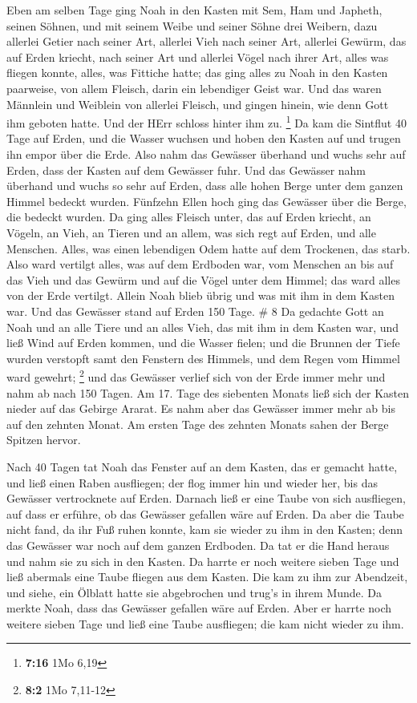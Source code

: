  Eben am selben Tage ging Noah in den Kasten mit Sem, Ham
und Japheth, seinen Söhnen, und mit seinem Weibe und seiner Söhne drei
Weibern,  dazu allerlei Getier nach seiner Art, allerlei
Vieh nach seiner Art, allerlei Gewürm, das auf Erden kriecht, nach
seiner Art und allerlei Vögel nach ihrer Art, alles was fliegen konnte,
alles, was Fittiche hatte;  das ging alles zu Noah in den
Kasten paarweise, von allem Fleisch, darin ein lebendiger Geist war.
 Und das waren Männlein und Weiblein von allerlei Fleisch,
und gingen hinein, wie denn Gott ihm geboten hatte. Und der HErr schloss
hinter ihm zu. \footnote{\textbf{7:16} 1Mo 6,19}  Da kam
die Sintflut 40 Tage auf Erden, und die Wasser wuchsen und hoben den
Kasten auf und trugen ihn empor über die Erde.  Also nahm
das Gewässer überhand und wuchs sehr auf Erden, dass der Kasten auf dem
Gewässer fuhr.  Und das Gewässer nahm überhand und wuchs so
sehr auf Erden, dass alle hohen Berge unter dem ganzen Himmel bedeckt
wurden.  Fünfzehn Ellen hoch ging das Gewässer über die
Berge, die bedeckt wurden.  Da ging alles Fleisch unter,
das auf Erden kriecht, an Vögeln, an Vieh, an Tieren und an allem, was
sich regt auf Erden, und alle Menschen.  Alles, was einen
lebendigen Odem hatte auf dem Trockenen, das starb.  Also
ward vertilgt alles, was auf dem Erdboden war, vom Menschen an bis auf
das Vieh und das Gewürm und auf die Vögel unter dem Himmel; das ward
alles von der Erde vertilgt. Allein Noah blieb übrig und was mit ihm in
dem Kasten war.  Und das Gewässer stand auf Erden 150 Tage.
\# 8  Da gedachte Gott an Noah und an alle Tiere und an
alles Vieh, das mit ihm in dem Kasten war, und ließ Wind auf Erden
kommen, und die Wasser fielen;  und die Brunnen der Tiefe
wurden verstopft samt den Fenstern des Himmels, und dem Regen vom Himmel
ward gewehrt; \footnote{\textbf{8:2} 1Mo 7,11-12}  und das
Gewässer verlief sich von der Erde immer mehr und nahm ab nach 150
Tagen.  Am 17. Tage des siebenten Monats ließ sich der
Kasten nieder auf das Gebirge Ararat.  Es nahm aber das
Gewässer immer mehr ab bis auf den zehnten Monat. Am ersten Tage des
zehnten Monats sahen der Berge Spitzen hervor.

 Nach 40 Tagen tat Noah das Fenster auf an dem Kasten, das
er gemacht hatte,  und ließ einen Raben ausfliegen; der flog
immer hin und wieder her, bis das Gewässer vertrocknete auf Erden.
 Darnach ließ er eine Taube von sich ausfliegen, auf dass er
erführe, ob das Gewässer gefallen wäre auf Erden.  Da aber
die Taube nicht fand, da ihr Fuß ruhen konnte, kam sie wieder zu ihm in
den Kasten; denn das Gewässer war noch auf dem ganzen Erdboden. Da tat
er die Hand heraus und nahm sie zu sich in den Kasten.  Da
harrte er noch weitere sieben Tage und ließ abermals eine Taube fliegen
aus dem Kasten.  Die kam zu ihm zur Abendzeit, und siehe,
ein Ölblatt hatte sie abgebrochen und trug's in ihrem Munde. Da merkte
Noah, dass das Gewässer gefallen wäre auf Erden.  Aber er
harrte noch weitere sieben Tage und ließ eine Taube ausfliegen; die kam
nicht wieder zu ihm.

